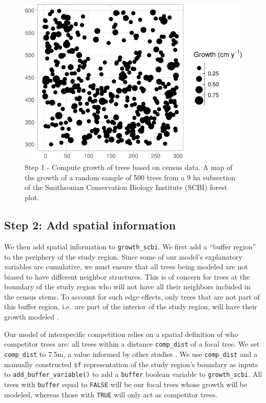 \documentclass[12pt]{article}
\begin{document}
\begin{figure}

{\centering \includegraphics[width=0.66\linewidth]{Figures/scbi-trees-1} 

}

\caption{Step 1 - Compute growth of trees based on census data. A map of the growth of a random sample of 500 trees from a 9 ha subsection of the Smithsonian Conservation Biology Institute (SCBI) forest plot.}\label{fig:scbi-trees}
\end{figure}

\hypertarget{spatial-information}{%
\subsection{Step 2: Add spatial information}\label{spatial-information}}

We then add spatial information to \texttt{growth\_scbi}. We first add a
``buffer region'' to the periphery of the study region. Since some of
our model's explanatory variables are cumulative, we must ensure that
all trees being modeled are not biased to have different neighbor
structures. This is of concern for trees at the boundary of the study
region who will not have all their neighbors included in the census
stems. To account for such edge effects, only trees that are not part of
this buffer region, i.e.~are part of the interior of the study region,
will have their growth modeled \citep{waller_applied_2004}.

Our model of interspecific competition relies on a spatial definition of
who competitor trees are: all trees within a distance
\texttt{comp\_dist} of a focal tree. We set \texttt{comp\_dist} to 7.5m,
a value informed by other studies \citep[\citet{uriarte_spatially_2004},
\citet{canham_neighborhood_2006}]{canham_neighborhood_2004}. We use
\texttt{comp\_dist} and a manually constructed \texttt{sf}
representation of the study region's boundary as inputs to
\texttt{add\_buffer\_variable()} to add a \texttt{buffer} boolean
variable to \texttt{growth\_scbi}. All trees with \texttt{buffer} equal
to \texttt{FALSE} will be our focal trees whose growth will be modeled,
whereas those with \texttt{TRUE} will only act as competitor trees.
\end{document}
